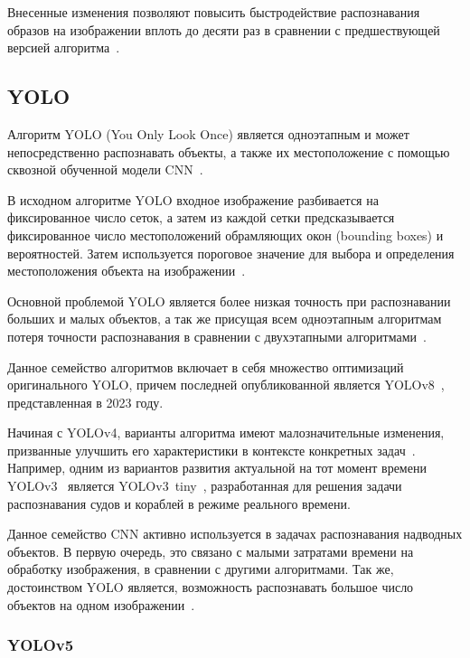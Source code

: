 
Внесенные изменения позволяют повысить быстродействие распознавания образов на изображении вплоть до десяти раз в сравнении с предшествующей версией алгоритма~\cite{faster-r-cnn}.

\subsection{YOLO}

Алгоритм YOLO (You Only Look Once) является одноэтапным и может непосредственно распознавать объекты, а также их местоположение с помощью сквозной обученной модели CNN~\cite{yolo-review}.

В исходном алгоритме YOLO входное изображение разбивается на фиксированное число сеток, а затем из каждой сетки предсказывается фиксированное число местоположений обрамляющих окон (bounding boxes) и вероятностей. Затем используется пороговое значение для выбора и определения местоположения объекта на изображении~\cite{yolo-review}.

Основной проблемой YOLO является более низкая точность при распознавании больших и малых объектов, а так же присущая всем одноэтапным алгоритмам потеря точности распознавания в сравнении с двухэтапными алгоритмами~\cite{yolo-review}.

Данное семейство алгоритмов включает в себя множество оптимизаций оригинального YOLO, причем последней опубликованной является YOLOv8~\cite{yolo-review-2023}, представленная в 2023 году.

Начиная с YOLOv4, варианты алгоритма имеют малозначительные изменения, призванные улучшить его характеристики в контексте конкретных задач~\cite{yolov3-ships}. Например, одним из вариантов развития актуальной на тот момент времени YOLOv3~\cite{yolov3} является YOLOv3~tiny~\cite{yolov3-tiny}, разработанная для решения задачи распознавания судов и кораблей в режиме реального времени.

Данное семейство CNN активно используется в задачах распознавания надводных объектов. В первую очередь, это связано с малыми затратами времени на обработку изображения, в сравнении с другими алгоритмами. Так же, достоинством YOLO является, возможность распознавать большое число объектов на одном изображении~\cite{yolo9000}.

\subsubsection{YOLOv5}

